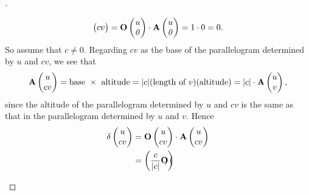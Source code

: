 \begin{proof}[]
\begin{enumerate}
\[\begin{pmatrix}
              cv
            \end{pmatrix} = \mathbf{O}\begin{pmatrix}
              u \\
              \mathit{0}
            \end{pmatrix} \cdot \mathbf{A}\begin{pmatrix}
              u \\
              \mathit{0}
            \end{pmatrix} = 1 \cdot 0 = 0.
          \]
          So assume that \(c \neq 0\).
          Regarding \(cv\) as the base of the parallelogram determined by \(u\) and \(cv\), we see that
          \[
            \mathbf{A}\begin{pmatrix}
              u \\
              cv
            \end{pmatrix} = \text{base } \times \text{ altitude} = \abs{c} (\text{length of } v) (\text{altitude}) = \abs{c} \cdot \mathbf{A}\begin{pmatrix}
              u \\
              v
            \end{pmatrix},
          \]
          since the altitude of the parallelogram determined by \(u\) and \(cv\) is the same as that in the parallelogram determined by \(u\) and \(v\).
          Hence
          \begin{align*}
            \delta\begin{pmatrix}
                    u \\
                    cv
                  \end{pmatrix} & = \mathbf{O}\begin{pmatrix}
                                                u \\
                                                cv
                                              \end{pmatrix} \cdot \mathbf{A}\begin{pmatrix}
                                                                              u \\
                                                                              cv
                                                                            \end{pmatrix}                                                            \\
                                  & = \left\lparen\frac{c}{\left\lvert c\right\rvert} \mathbf{O}\begin{pmatrix}

\end{pmatrix}\right\rparen
\end{align*}
\end{enumerate}
\end{proof}
